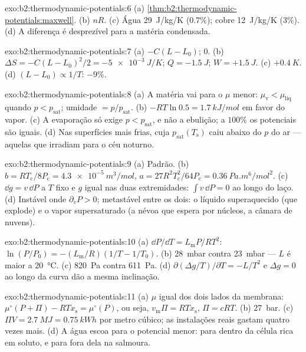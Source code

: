 \begin{solution}{exo:b2:thermodynamic-potentials:6}
(a) \cref{thm:b2:thermodynamic-potentials:maxwell}. (b) $nR$. (c) Água
\qty{29}{J/kg/K} ($0.7\%$); cobre \qty{12}{J/kg/K} ($3\%$). (d) A
diferença é desprezível para a matéria condensada.
\end{solution}

\begin{solution}{exo:b2:thermodynamic-potentials:7}
(a) $-C(L - L_0)$; $0$. (b) $\Delta S = -C(L - L_0)^2/2 = \qty{-5e-3}{J/K}$; $Q =
\qty{-1.5}{J}$; $W = +\qty{1.5}{J}$. (c) $+\qty{0.4}{K}$. (d) $(L - L_0) \propto
1/T$: $-9\%$.
\end{solution}

\begin{solution}{exo:b2:thermodynamic-potentials:8}
(a) A matéria vai para o $\mu$ menor: $\mu_{\text{v}} < \mu_{\text{liq}}$ quando $p <
p_{\text{sat}}$; umidade $= p/p_{\text{sat}}$. (b) $-RT\ln 0.5 = \qty{1.7}{kJ/mol}$
em favor do vapor. (c) A evaporação só exige $p < p_{\text{sat}}$,
e não a ebulição; a $100\%$ os potenciais são iguais. (d) Nas superfícies
mais frias, cuja $p_{\text{sat}}(T_{\text{s}})$ caiu abaixo do $p$ do ar
--- aquelas que irradiam para o céu noturno.
\end{solution}

\begin{solution}{exo:b2:thermodynamic-potentials:9}
(a) Padrão. (b) $b = RT_{\text{c}}/8P_{\text{c}} = \qty{4.3e-5}{m^3/mol}$, $a =
27R^2T_{\text{c}}^2/64P_{\text{c}} = \qty{0.36}{Pa.m^6/mol^2}$. (c) $\dd g = v\,\dd P$
a $T$ fixo e $g$ igual nas duas extremidades: $\int v\,\dd P = 0$ ao longo do
laço. (d) Instável onde $\partial_vP > 0$; metastável entre os dois: o
líquido superaquecido (que explode) e o vapor supersaturado (a névoa que
espera por núcleos, a câmara de nuvens).
\end{solution}

\begin{solution}{exo:b2:thermodynamic-potentials:10}
(a) $\dd P/\dd T = L_{\text{m}}P/RT^2$: $\ln(P/P_0) = -(L_{\text{m}}/R)(1/T - 1/T_0)$.
(b) \qty{28}{mbar} contra \qty{23}{mbar} --- $L$ é maior a \qty{20}{\celsius}.
(c) \qty{820}{Pa} contra \qty{611}{Pa}. (d) $\partial(\Delta g/T)/\partial T = -L/T^2$
e $\Delta g = 0$ ao longo da curva dão a mesma inclinação.
\end{solution}

\begin{solution}{exo:b2:thermodynamic-potentials:11}
(a) $\mu$ igual dos dois lados da membrana: $\mu^\circ(P + \Pi) - RTx_{\text{s}} =
\mu^\circ(P)$, ou seja, $v_{\text{m}}\Pi = RTx_{\text{s}}$, $\Pi = cRT$. (b) \qty{27}{bar}.
(c) $\Pi V = \qty{2.7}{MJ} = \qty{0.75}{kWh}$ por metro cúbico; as instalações reais
gastam quatro vezes mais. (d) A água escoa para o potencial menor: para dentro da
célula rica em soluto, e para fora dela na salmoura.
\end{solution}

